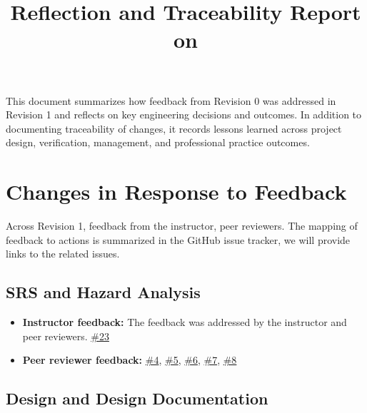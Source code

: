 \documentclass{article}
\title{Reflection and Traceability Report on \progname}
\author{\authname}
\date{}
\begin{document}
\maketitle

This document summarizes how feedback from Revision 0 was addressed in Revision 1
and reflects on key engineering decisions and outcomes. In addition to documenting
traceability of changes, it records lessons learned across project design,
verification, management, and professional practice outcomes.

\section{Changes in Response to Feedback}

Across Revision 1, feedback from the instructor, peer reviewers. The mapping of feedback to actions is summarized in the GitHub issue tracker, we will provide links to the related issues.

\subsection{SRS and Hazard Analysis}
\begin{itemize}
  \item \textbf{Instructor feedback:} The feedback was addressed by the instructor and peer reviewers. \href{https://github.com/zhangwenchili/CAS741-EelbrainPipeline/issues/23}{\#23}
  \item \textbf{Peer reviewer feedback:} \href{https://github.com/zhangwenchili/CAS741-EelbrainPipeline/issues/4}{\#4}, \href{https://github.com/zhangwenchili/CAS741-EelbrainPipeline/issues/5}{\#5}, \href{https://github.com/zhangwenchili/CAS741-EelbrainPipeline/issues/6}{\#6}, \href{https://github.com/zhangwenchili/CAS741-EelbrainPipeline/issues/7}{\#7}, \href{https://github.com/zhangwenchili/CAS741-EelbrainPipeline/issues/8}{\#8}
\end{itemize}

\subsection{Design and Design Documentation}
\end{document}
